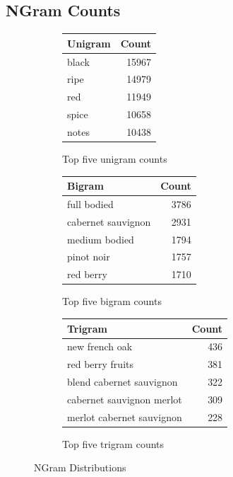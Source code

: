 \documentclass[12pt]{IEEEtran}
\begin{document}
\subsection{NGram Counts}
\begin{figure}[H]
    \centering
    \begin{subfigure}[t]{\columnwidth}
        \centering
        \begin{tabular}{ lr  }
            \hline
            Unigram & Count \\
            \hline
            black  & 15967 \\
            ripe   & 14979 \\
            red    & 11949 \\
            spice  & 10658 \\
            notes  & 10438
        \end{tabular}
        \caption{ Top five unigram counts}
    \end{subfigure}
    \begin{subfigure}[t]{\columnwidth}
        \centering
        \begin{tabular}{ lr  }
            \hline
            Bigram & Count \\
            \hline
            full bodied & 3786 \\
            cabernet sauvignon & 2931 \\
            medium bodied & 1794 \\
            pinot noir & 1757 \\
            red berry & 1710
        \end{tabular}
        \caption{ Top five bigram counts}
    \end{subfigure}
    \begin{subfigure}[t]{\columnwidth}
        \centering
        \begin{tabular}{ lr  }
            \hline
            Trigram & Count \\
            \hline
            new french oak  & 436 \\
            red berry fruits & 381 \\
            blend cabernet sauvignon & 322 \\
            cabernet sauvignon merlot & 309 \\
            merlot cabernet sauvignon & 228 
        \end{tabular}
        \caption{ Top five trigram counts} 
    \end{subfigure} 
    \caption{NGram Distributions}
\end{figure}
\end{document}
